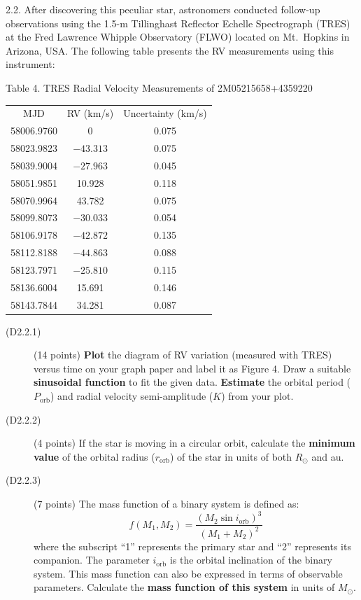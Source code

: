 2.2. After discovering this peculiar star, astronomers conducted follow-up
observations using the 1.5-m Tillinghast Reflector Echelle Spectrograph
(TRES) at the Fred Lawrence Whipple Observatory (FLWO) located on Mt.\
Hopkins in Arizona, USA. The following table presents the RV measurements
using this instrument:

\begin{center}
Table 4. TRES Radial Velocity Measurements of 2M05215658+4359220

\medskip
\begin{tabular}{ccc}
MJD & RV (km/s) & Uncertainty (km/s) \\
58006.9760 & 0 & 0.075 \\
58023.9823 & $-43.313$ & 0.075 \\
58039.9004 & $-27.963$ & 0.045 \\
58051.9851 & 10.928 & 0.118 \\
58070.9964 & 43.782 & 0.075 \\
58099.8073 & $-30.033$ & 0.054 \\
58106.9178 & $-42.872$ & 0.135 \\
58112.8188 & $-44.863$ & 0.088 \\
58123.7971 & $-25.810$ & 0.115 \\
58136.6004 & 15.691 & 0.146 \\
58143.7844 & 34.281 & 0.087 \\
\end{tabular}
\end{center}

\begin{description}
\item[(D2.2.1)] (14 points) \textbf{Plot} the diagram of RV variation
  (measured with TRES) versus time on your graph paper and label it as
  Figure 4. Draw a suitable \textbf{sinusoidal function} to fit the given
  data. \textbf{Estimate} the orbital period ($P_{\mathrm{orb}}$) and radial
  velocity semi-amplitude ($K$) from your plot.
\item[(D2.2.2)] (4 points) If the star is moving in a circular orbit,
  calculate the \textbf{minimum value} of the orbital radius
  ($r_{\mathrm{orb}}$) of the star in units of both $R_\odot$ and au.
\item[(D2.2.3)] (7 points) The mass function of a binary system is defined
  as:
  \[ f(M_1, M_2) = \frac{(M_2 \sin i_{\mathrm{orb}})^3}{(M_1 + M_2)^2} \]
  where the subscript ``1'' represents the primary star and ``2'' represents
  its companion. The parameter $i_{\mathrm{orb}}$ is the orbital inclination
  of the binary system. This mass function can also be expressed in terms of
  observable parameters. Calculate the \textbf{mass function of this system}
  in units of $M_\odot$.
\end{description}

